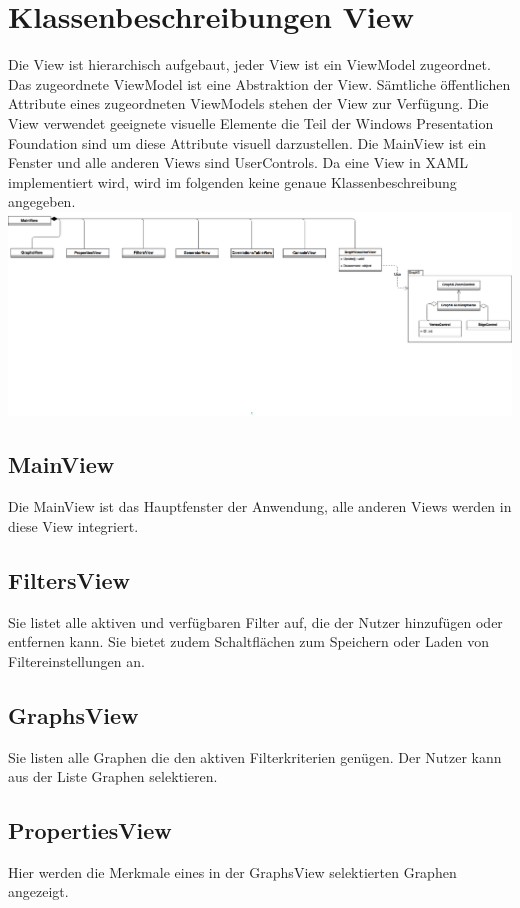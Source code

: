 \documentclass[13pt]{scrreprt}
\begin{document}
	\chapter{Klassenbeschreibungen View}
	Die View ist hierarchisch aufgebaut, jeder View ist ein ViewModel zugeordnet. Das zugeordnete ViewModel ist eine Abstraktion der View. S\"amtliche \"offentlichen Attribute eines zugeordneten ViewModels stehen der View zur Verf\"ugung. Die View verwendet geeignete visuelle Elemente die Teil der Windows Presentation Foundation sind um diese Attribute visuell darzustellen. Die MainView ist ein Fenster und alle anderen Views sind UserControls. Da eine View in XAML implementiert wird, wird im folgenden keine genaue Klassenbeschreibung angegeben.
	\newline
	\includegraphics[angle=90, scale=0.3, center]{View.png}
	\section{MainView}
	Die MainView ist das Hauptfenster der Anwendung, alle anderen Views werden in diese View integriert.
	\section{FiltersView}
	Sie listet alle aktiven und verfügbaren Filter auf, die der Nutzer hinzuf\"ugen oder entfernen kann. Sie bietet zudem Schaltfl\"achen zum Speichern oder Laden von Filtereinstellungen an.
	\section{GraphsView}
	Sie listen alle Graphen die den aktiven Filterkriterien gen\"ugen. Der Nutzer kann aus der Liste Graphen selektieren.
	\section{PropertiesView}
	Hier werden die Merkmale eines in der GraphsView selektierten Graphen angezeigt.
	\newpage
\end{document}

